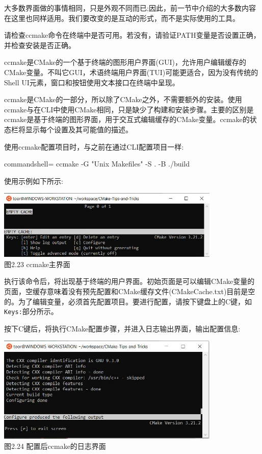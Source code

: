 
大多数界面做的事情相同，只是外观不同而已;因此，前一节中介绍的大多数内容在这里也同样适用。我们要改变的是互动的形式，而不是实际使用的工具。

\begin{tcolorbox}[colback=webgreen!5!white,colframe=webgreen!75!black,title=Note]
请检查ccmake命令在终端中是否可用。若没有，请验证PATH变量是否设置正确，并检查安装是否正确。
\end{tcolorbox}


ccmake是CMake的一个基于终端的图形用户界面(GUI)，允许用户编辑缓存的CMake变量。不叫它GUI，术语终端用户界面(TUI)可能更适合，因为没有传统的Shell UI元素，窗口和按钮使用文本接口在终端中呈现。

ccmake是CMake的一部分，所以除了CMake之外，不需要额外的安装。使用ccmake与在CLI中使用CMake相同，只是缺少了构建和安装步骤。主要的区别是ccmake是基于终端的图形界面，用于交互式编辑缓存的CMake变量。ccmake的状态栏将显示每个设置及其可能值的描述。

使用ccmake配置项目时，与之前在通过CLI配置项目一样:

\begin{tcblisting}{commandshell={}}
ccmake -G "Unix Makefiles" -S . -B ./build
\end{tcblisting}

使用示例如下所示:

\begin{center}
\includegraphics[width=0.8\textwidth]{content/1/chapter2/images/23.jpg}\\
图2.23 ccmake主界面
\end{center}

执行该命令后，将出现基于终端的用户界面。初始页面是可以编辑CMake变量的页面，空缓存意味着没有预先配置和CMake缓存文件(CMakeCache.txt)目前是空的。为了编辑变量，必须首先配置项目。要进行配置，请按下键盘上的C键，如\texttt{Keys:}部分所示。

按下C键后，将执行CMake配置步骤，并进入日志输出界面，输出配置信息:

\begin{center}
\includegraphics[width=0.8\textwidth]{content/1/chapter2/images/24.jpg}\\
图2.24 配置后ccmake的日志界面
\end{center}

